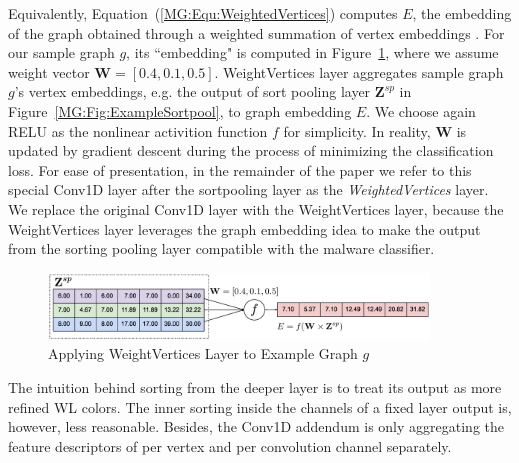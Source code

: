 Equivalently, Equation~(\ref{MG:Equ:WeightedVertices}) computes $E$, the embedding of the graph obtained through a weighted summation of vertex embeddings \cite{GraphEmbedding}.
For our sample graph $g$, its ``embedding" is computed in Figure~\ref{MG:Fig:ExampleWeightedVertice}, where we assume weight vector $\mathbf{W}=[0.4, 0.1, 0.5]$.
WeightVertices layer aggregates sample graph $g$'s vertex embeddings,
e.g. the output of sort pooling layer $\mathbf{Z}^{sp}$ in Figure~\ref{MG:Fig:ExampleSortpool}, to graph embedding $E$.
We choose again RELU as the nonlinear activition function $f$ for simplicity.
In reality, $\mathbf{W}$ is updated by gradient descent during the process of minimizing the classification loss.
For ease of presentation, in the remainder of the paper we refer to this special Conv1D layer after the sortpooling layer as the \textit{WeightedVertices} layer.
We replace the original Conv1D layer with the WeightVertices layer, because the WeightVertices layer leverages the graph embedding idea to make the output from the sorting pooling layer compatible with the malware classifier.

\begin{figure}[htbp]
    \centerline{\includegraphics[width=0.90\textwidth]{Magic/figures/ExampleWeightedVertice.eps}}
    \caption{Applying WeightVertices Layer to Example Graph $g$}
    \label{MG:Fig:ExampleWeightedVertice}
\end{figure}

The intuition behind sorting from the deeper layer is to treat its output as more refined WL colors\cite{WlAlgorithm, WlGraphKernel}.
The inner sorting inside the channels of a fixed layer output is, however, less reasonable.
Besides, the Conv1D addendum is only aggregating the feature descriptors of per vertex and per convolution channel separately.


